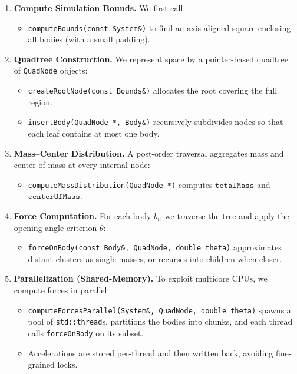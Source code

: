 \documentclass{article}
\begin{document}
\begin{enumerate}
  \item \textbf{Compute Simulation Bounds.}  
    We first call
    \begin{itemize}
      \item \texttt{computeBounds(const System\&)}  
        to find an axis-aligned square enclosing all bodies (with a small padding).
    \end{itemize}

  \item \textbf{Quadtree Construction.}  
    We represent space by a pointer-based quadtree of \texttt{QuadNode} objects:
    \begin{itemize}
      \item \texttt{createRootNode(const Bounds\&)} allocates the root covering the full region.  
      \item \texttt{insertBody(QuadNode *, Body\&)} recursively subdivides nodes so that each leaf contains at most one body.
    \end{itemize}

  \item \textbf{Mass–Center Distribution.}  
    A post-order traversal aggregates mass and center-of-mass at every internal node:
    \begin{itemize}
      \item \texttt{computeMassDistribution(QuadNode *)} computes \(\texttt{totalMass}\) and \(\texttt{centerOfMass}\).
    \end{itemize}

  \item \textbf{Force Computation.}  
    For each body \(b_i\), we traverse the tree and apply the opening-angle criterion \(\theta\):
    \begin{itemize}
      \item \texttt{forceOnBody(const Body\&, QuadNode\*, double theta)}  
        approximates distant clusters as single masses, or recurses into children when closer.
    \end{itemize}

  \item \textbf{Parallelization (Shared-Memory).}  
    To exploit multicore CPUs, we compute forces in parallel:
    \begin{itemize}
      \item \texttt{computeForcesParallel(System\&, QuadNode\*, double theta)}  
        spawns a pool of \texttt{std::thread}s, partitions the bodies into chunks, and each thread calls \texttt{forceOnBody} on its subset.  
      \item Accelerations are stored per-thread and then written back, avoiding fine-grained locks.
    \end{itemize}


\end{enumerate}
\end{document}
